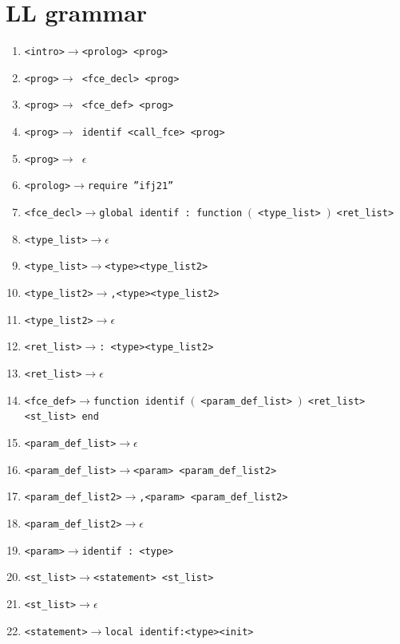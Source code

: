 \documentclass[11pt]{article}
\newcommand{\term}[1]{{\color{red}#1}}
\newcommand{\arrow}{$\rightarrow$}
\begin{document}
\section{LL grammar}
\begin{enumerate}
    {\color{red}}
    \item \texttt{<intro>\arrow{}<prolog> <prog> }  
    \item \texttt{<prog>\arrow{} <fce\_decl> <prog>}
    \item \texttt{<prog>\arrow{} <fce\_def> <prog>}
    \item \texttt{<prog>\arrow{} \term{identif} <call\_fce> <prog>}
    \item \texttt{<prog>\arrow{} $\epsilon$}    
    \item \texttt{<prolog>\arrow{}\term{require} \term{''ifj21''}   }
    \item \texttt{<fce\_decl>\arrow{}\term{global} \term{identif} \term{:} \term{function} \term{$($} <type\_list> \term{$)$} <ret\_list>}
    \item \texttt{<type\_list>\arrow{}$\epsilon$}
    \item \texttt{<type\_list>\arrow{}<type><type\_list2>}
    \item \texttt{<type\_list2>\arrow{}\term{,}<type><type\_list2>} 
    \item \texttt{<type\_list2>\arrow{}$\epsilon$}
    \item \texttt{<ret\_list>\arrow{}\term{:} <type><type\_list2>}
    \item \texttt{<ret\_list>\arrow{}$\epsilon$}
    \item \texttt{<fce\_def>\arrow{}\term{function} \term{identif} \term{$($} <param\_def\_list> \term{$)$} <ret\_list> <st\_list> \term{end}}
    \item \texttt{<param\_def\_list>\arrow{}$\epsilon$}
    \item \texttt{<param\_def\_list>\arrow{}<param> <param\_def\_list2>}
    \item \texttt{<param\_def\_list2>\arrow{}\term{,}<param> <param\_def\_list2>}
    \item \texttt{<param\_def\_list2>\arrow{}$\epsilon$}
    \item \texttt{<param>\arrow{}\term{identif} \term{:} <type>}
    \item \texttt{<st\_list>\arrow{}<statement> <st\_list>}
    \item \texttt{<st\_list>\arrow{}$\epsilon$}
    \item \texttt{<statement>\arrow{}\term{local} \term{identif}\term{:}<type><init>}

\end{enumerate}
\end{document}
